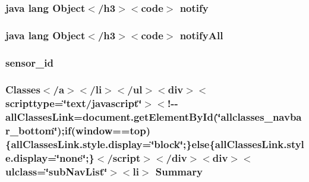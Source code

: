 \hypertarget{_my_s_q_l_connector_8measure_8html_ae99ae10b5010594dbda4794e02db271b}{
\subsubsection[{notify}]{\setlength{\rightskip}{0pt plus 5cm}java lang Object$<$/h3$>$$<$code$>$ notify}}\label{_my_s_q_l_connector_8measure_8html_ae99ae10b5010594dbda4794e02db271b}
\hypertarget{_my_s_q_l_connector_8measure_8html_a1279357e6e09e33e75b55eb05fdb6436}{
\subsubsection[{notify\-All}]{\setlength{\rightskip}{0pt plus 5cm}java lang Object$<$/h3$>$$<$code$>$ notify\-All}}\label{_my_s_q_l_connector_8measure_8html_a1279357e6e09e33e75b55eb05fdb6436}
\hypertarget{_my_s_q_l_connector_8measure_8html_a48a4081a48bf69abc4ba5d704ec33919}{
\subsubsection[{sensor\-\_\-id}]{\setlength{\rightskip}{0pt plus 5cm}sensor\-\_\-id}}\label{_my_s_q_l_connector_8measure_8html_a48a4081a48bf69abc4ba5d704ec33919}
\hypertarget{_my_s_q_l_connector_8measure_8html_a6f9ab45abc9b0679dc1b132fbacfc681}{
\subsubsection[{Summary}]{\setlength{\rightskip}{0pt plus 5cm}Classes$<$/{\bf a}$>$$<$/li$>$$<$/ul$>$$<$div$>$$<$scripttype=\char`\"{}text/javascript\char`\"{}$>$$<$!-\/-\/all\-Classes\-Link=document.\-get\-Element\-By\-Id(\char`\"{}allclasses\-\_\-navbar\-\_\-bottom\char`\"{});if(window==top)\{all\-Classes\-Link.\-style.\-display=\char`\"{}block\char`\"{};\}else\{all\-Classes\-Link.\-style.\-display=\char`\"{}none\char`\"{};\}$<$/script$>$$<$/div$>$$<$div$>$$<$ulclass=\char`\"{}sub\-Nav\-List\char`\"{}$>$$<$li$>$ Summary}}\label{_my_s_q_l_connector_8measure_8html_a6f9ab45abc9b0679dc1b132fbacfc681}

